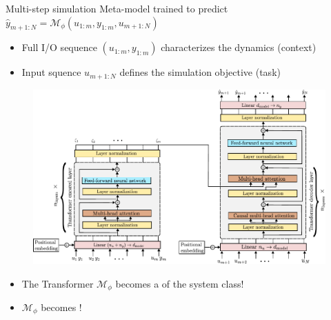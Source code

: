 \documentclass{beamer}
\newcommand{\free}{\mathcal{M}}
\begin{document}
\begin{frame}{Multi-step simulation}
     Meta-model trained to predict $\hat y_{m+1:N} = \free_\phi(u_{1:m}, y_{1:m}, u_{m+1:N})$
     \begin{itemize}
     \item Full I/O sequence $(u_{1:m}, y_{1:m})$ characterizes the dynamics (context)
     \item Input squence $u_{m+1:N}$ defines the simulation objective (task) 
     \end{itemize}
     \begin{figure}
          \includegraphics[height=150 pt]{fig/architecture/encoder_decoder_architecture.pdf}
     \end{figure}
     \pause
     \begin{itemize}
     \item The Transformer $\free_\phi$  becomes a   of the system class!
     \item $ \free_\phi$ becomes !
     \end{itemize}
     \end{frame}
     
\end{document}
